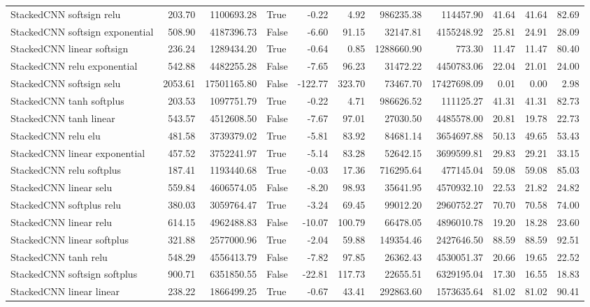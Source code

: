 \begin{tabular}{lrrlrrrrrrr}
StackedCNN softsign relu & 203.70 & 1100693.28 & True & -0.22 & 4.92 & 986235.38 & 114457.90 & 41.64 & 41.64 & 82.69 \\
StackedCNN softsign exponential & 508.90 & 4187396.73 & False & -6.60 & 91.15 & 32147.81 & 4155248.92 & 25.81 & 24.91 & 28.09 \\
StackedCNN linear softsign & 236.24 & 1289434.20 & True & -0.64 & 0.85 & 1288660.90 & 773.30 & 11.47 & 11.47 & 80.40 \\
StackedCNN relu exponential & 542.88 & 4482255.28 & False & -7.65 & 96.23 & 31472.22 & 4450783.06 & 22.04 & 21.01 & 24.00 \\
StackedCNN softsign selu & 2053.61 & 17501165.80 & False & -122.77 & 323.70 & 73467.70 & 17427698.09 & 0.01 & 0.00 & 2.98 \\
StackedCNN tanh softplus & 203.53 & 1097751.79 & True & -0.22 & 4.71 & 986626.52 & 111125.27 & 41.31 & 41.31 & 82.73 \\
StackedCNN tanh linear & 543.57 & 4512608.50 & False & -7.67 & 97.01 & 27030.50 & 4485578.00 & 20.81 & 19.78 & 22.73 \\
StackedCNN relu elu & 481.58 & 3739379.02 & True & -5.81 & 83.92 & 84681.14 & 3654697.88 & 50.13 & 49.65 & 53.43 \\
StackedCNN linear exponential & 457.52 & 3752241.97 & True & -5.14 & 83.28 & 52642.15 & 3699599.81 & 29.83 & 29.21 & 33.15 \\
StackedCNN relu softplus & 187.41 & 1193440.68 & True & -0.03 & 17.36 & 716295.64 & 477145.04 & 59.08 & 59.08 & 85.03 \\
StackedCNN linear selu & 559.84 & 4606574.05 & False & -8.20 & 98.93 & 35641.95 & 4570932.10 & 22.53 & 21.82 & 24.82 \\
StackedCNN softplus relu & 380.03 & 3059764.47 & True & -3.24 & 69.45 & 99012.20 & 2960752.27 & 70.70 & 70.58 & 74.00 \\
StackedCNN linear relu & 614.15 & 4962488.83 & False & -10.07 & 100.79 & 66478.05 & 4896010.78 & 19.20 & 18.28 & 23.60 \\
StackedCNN linear softplus & 321.88 & 2577000.96 & True & -2.04 & 59.88 & 149354.46 & 2427646.50 & 88.59 & 88.59 & 92.51 \\
StackedCNN tanh relu & 548.29 & 4556413.79 & False & -7.82 & 97.85 & 26362.43 & 4530051.37 & 20.66 & 19.65 & 22.52 \\
StackedCNN softsign softplus & 900.71 & 6351850.55 & False & -22.81 & 117.73 & 22655.51 & 6329195.04 & 17.30 & 16.55 & 18.83 \\
StackedCNN linear linear & 238.22 & 1866499.25 & True & -0.67 & 43.41 & 292863.60 & 1573635.64 & 81.02 & 81.02 & 90.41 \\

\end{tabular}
